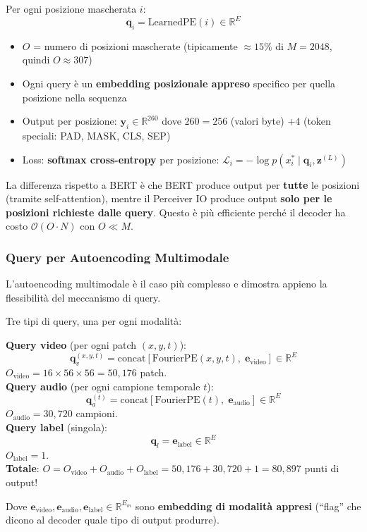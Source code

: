 \documentclass[12pt,a4paper]{article}
\begin{document}
\begin{formulabox}
Per ogni posizione mascherata $i$:
\[
\mathbf{q}_i = \text{LearnedPE}(i) \in \mathbb{R}^E
\]
\begin{itemize}
    \item $O$ = numero di posizioni mascherate (tipicamente $\approx 15\%$ di $M = 2048$, quindi $O \approx 307$)
    \item Ogni query \`e un \textbf{embedding posizionale appreso} specifico per quella posizione nella sequenza
    \item Output per posizione: $\mathbf{y}_i \in \mathbb{R}^{260}$ dove $260 = 256$ (valori byte) $+ 4$ (token speciali: PAD, MASK, CLS, SEP)
    \item Loss: \textbf{softmax cross-entropy} per posizione: $\mathcal{L}_i = -\log p(x_i^* \mid \mathbf{q}_i, \mathbf{z}^{(L)})$
\end{itemize}
\end{formulabox}

La differenza rispetto a BERT \`e che BERT produce output per \textbf{tutte} le posizioni (tramite self-attention), mentre il Perceiver IO produce output \textbf{solo per le posizioni richieste dalle query}. Questo \`e pi\`u efficiente perch\'e il decoder ha costo $\mathcal{O}(O \cdot N)$ con $O \ll M$.

\subsubsection{Query per Autoencoding Multimodale}

L'autoencoding multimodale \`e il caso pi\`u complesso e dimostra appieno la flessibilit\`a del meccanismo di query.

\begin{formulabox}
Tre tipi di query, una per ogni modalit\`a:

\textbf{Query video} (per ogni patch $(x, y, t)$):
\[
\mathbf{q}_v^{(x,y,t)} = \text{concat}\!\left[\text{FourierPE}(x, y, t), \; \mathbf{e}_{\text{video}}\right] \in \mathbb{R}^E
\]
$O_{\text{video}} = 16 \times 56 \times 56 = 50{,}176$ patch.\\[6pt]

\textbf{Query audio} (per ogni campione temporale $t$):
\[
\mathbf{q}_a^{(t)} = \text{concat}\!\left[\text{FourierPE}(t), \; \mathbf{e}_{\text{audio}}\right] \in \mathbb{R}^E
\]
$O_{\text{audio}} = 30{,}720$ campioni.\\[6pt]

\textbf{Query label} (singola):
\[
\mathbf{q}_l = \mathbf{e}_{\text{label}} \in \mathbb{R}^E
\]
$O_{\text{label}} = 1$.\\[6pt]

\textbf{Totale}: $O = O_{\text{video}} + O_{\text{audio}} + O_{\text{label}} = 50{,}176 + 30{,}720 + 1 = 80{,}897$ punti di output!

Dove $\mathbf{e}_{\text{video}}, \mathbf{e}_{\text{audio}}, \mathbf{e}_{\text{label}} \in \mathbb{R}^{E_m}$ sono \textbf{embedding di modalit\`a appresi} (``flag'' che dicono al decoder quale tipo di output produrre).
\end{formulabox}
\end{document}
